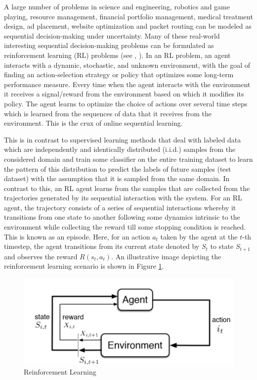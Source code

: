 A large number of problems in science and engineering, robotics and game playing, resource management, financial portfolio management, medical treatment design, ad placement, website optimization and packet routing can be modeled as sequential decision-making under uncertainty. Many of these real-world interesting
sequential decision-making problems can be formulated as reinforcement learning (RL) problems (see \citep{bertsekas1996neuro}, \citep{sutton1998reinforcement}). In an RL problem, an agent interacts with a dynamic, stochastic, and unknown environment, with the goal of finding an action-selection strategy or policy that optimizes some long-term performance measure. Every time when the agent interacts with the environment it receives a signal/reward from the environment based on which it modifies its policy. The agent learns to optimize the choice of actions over several time steps which is learned from the sequences of data that it receives from the environment. This is the crux of online sequential learning. 

    This is in contrast to supervised learning methods that deal with labeled data which are independently and identically distributed (i.i.d.) samples from the considered domain and train some classifier on the entire training dataset to learn the pattern of this distribution to predict the labels of future samples (test dataset) with the assumption that it is sampled from the same domain. In contrast to this, an RL agent learns from the samples that are collected from the trajectories generated by its sequential interaction with the system. For an RL agent, the trajectory consists of a series of sequential interactions whereby it transitions from one state to another following some dynamics intrinsic to the environment while collecting the reward till some stopping condition is reached. This is known as an episode. Here, for an action $a_t$ taken by the agent at the $t$-th timestep, the agent transitions from its current state denoted by $S_{t}$ to state $S_{t+1}$ and observes the reward $R(s_t,a_t)$. An illustrative image depicting the reinforcement learning scenario is shown in Figure \ref{fig:rl}.
    

\begin{figure}[!th]
\includegraphics[scale=0.4]{img/RL1.png}
\caption{Reinforcement Learning}
\label{fig:rl}
\end{figure}

